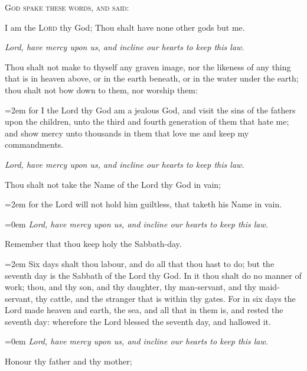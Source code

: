 \vspace{-1ex}
\begin{center}
	\textsc{God spake these words, and said:}
\end{center}
\par\noindent
    I am the \textsc{Lord} thy God; Thou shalt have none other gods but me.\par
    \textit{Lord, have mercy upon us, and incline our hearts to keep this law.}
    \par\noindent
    Thou shalt not make to thyself any graven image, nor the likeness of any thing that is in heaven above, or in the earth beneath, or in the water under the earth; thou shalt not bow down to them, nor worship them:
    \par\noindent
    \leftskip=2em
	{\small{for I the Lord thy God am a jealous God, and visit the sins of the fathers upon the children, unto the third and fourth generation of them that hate me; and show mercy unto thousands in them that love me and keep my commandments.}}
	\par
	\leftskip=0cm
    \textit{Lord, have mercy upon us, and incline our hearts to keep this law.}
    \par\noindent
    Thou shalt not take the Name of the Lord thy God in vain;
    \par\noindent
    \leftskip=2em
	{\small{for the Lord will not hold him guiltless, that taketh his Name in vain.}}
	\par
	\leftskip=0em
    \textit{Lord, have mercy upon us, and incline our hearts to keep this law.}
    \par\noindent
    Remember that thou keep holy the Sabbath-day.
    \par\noindent
    \leftskip=2em
	{\small{Six days shalt thou labour, and do all that thou hast to do; but the seventh day is the Sabbath of the Lord thy God. In it thou shalt do no manner of work; thou, and thy son, and thy daughter, thy man-servant, and thy maid-servant, thy cattle, and the stranger that is within thy gates. For in six days the Lord made heaven and earth, the sea, and all that in them is, and rested the seventh day: wherefore the Lord blessed the seventh day, and hallowed it.}}
	\par
	\leftskip=0em
    \textit{Lord, have mercy upon us, and incline our hearts to keep this law.}
    \par\noindent
    Honour thy father and thy mother;
